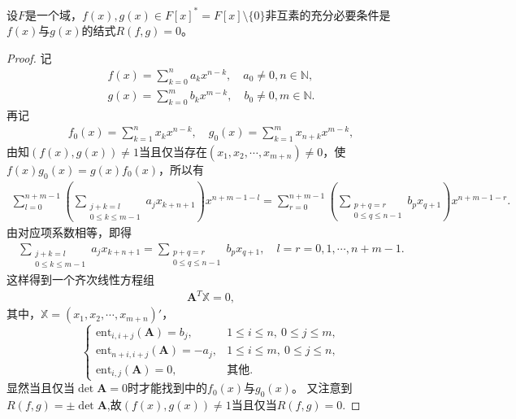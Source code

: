 \documentclass[../../main.tex]{subfiles}%
\begin{document}
\begin{theorem}\label{theorem:抽象代数--定理2.6.4}
设$F$是一个域，$f(x),g(x)\in F[x]^*=F[x]\setminus \{0\}$非互素的充分必要条件是$f(x)$与$g(x)$的结式$R(f,g)=0$。
\end{theorem}
\begin{proof}

记
\begin{align*}
f(x)=\sum_{k=0}^n a_kx^{n-k},\quad a_0\neq0,n\in\mathbb{N}, \\
g(x)=\sum_{k=0}^m b_kx^{m-k},\quad b_0\neq0,m\in\mathbb{N}.
\end{align*}
再记
\begin{align*}
f_0(x)=\sum_{k=1}^n x_kx^{n-k},\quad g_0(x)=\sum_{k=1}^m x_{n+k}x^{m-k},
\end{align*}
由知$(f(x),g(x))\neq1$当且仅当存在$(x_1,x_2,\cdots,x_{m+n})\neq0$，使$f(x)g_0(x)=g(x)f_0(x)$，所以有
\begin{align*}
\sum_{l=0}^{n+m-1}\left( \sum_{\substack{j+k=l\\0\leqslant k\leqslant m-1}} a_jx_{k+n+1} \right)x^{n+m-1-l} 
=\sum_{r=0}^{n+m-1}\left( \sum_{\substack{p+q=r\\0\leqslant q\leqslant n-1}} b_px_{q+1} \right)x^{n+m-1-r}.
\end{align*}
由对应项系数相等，即得
\begin{align*}
\sum_{\substack{j+k=l\\0\leqslant k\leqslant m-1}} a_jx_{k+n+1}=\sum_{\substack{p+q=r\\0\leqslant q\leqslant n-1}} b_px_{q+1},\quad l=r=0,1,\cdots,n+m-1.
\end{align*}
这样得到一个齐次线性方程组
\begin{align*}
\boldsymbol{A}^T\mathbb{X}=0,
\end{align*}
其中，$\mathbb{X}=(x_1,x_2,\cdots,x_{m+n})'$，
\[
\begin{cases}
\mathrm{ent}_{i,i+j}(\boldsymbol{A})=b_j, & 1\leqslant i\leqslant n,\ 0\leqslant j\leqslant m, \\
\mathrm{ent}_{n+i,i+j}(\boldsymbol{A})=-a_j, & 1\leqslant i\leqslant m,\ 0\leqslant j\leqslant n, \\
\mathrm{ent}_{i,j}(\boldsymbol{A})=0, & \text{其他}.
\end{cases}
\]
显然当且仅当$\det\boldsymbol{A}=0$时才能找到中的$f_0(x)$与$g_0(x)$。
又注意到$R(f,g)=\pm\det \boldsymbol{A}$,故$(f(x),g(x))\neq1$当且仅当$R(f,g)=0.$

\end{proof}
\end{document}

